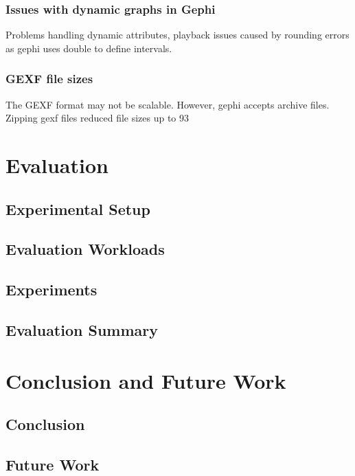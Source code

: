 \documentclass[UKenglish, a4paper]{ifimaster}
\begin{document}
    \subsection{Issues with dynamic graphs in Gephi}
        Problems handling dynamic attributes, playback issues caused by
        rounding errors as gephi uses double to define intervals.
    \subsection{GEXF file sizes}
        The GEXF format may not be scalable. However, gephi accepts
        archive files. Zipping gexf files reduced file sizes up to 93%

\chapter{Evaluation}
\label{ch:evaluation}
    \section{Experimental Setup}
    \section{Evaluation Workloads}
    \section{Experiments}
    \section{Evaluation Summary}

\chapter{Conclusion and Future Work}
\label{ch:conclusion-and-future-work}
    \section{Conclusion}
    \section{Future Work}


\backmatter{}
\printbibliography{}
\end{document}
